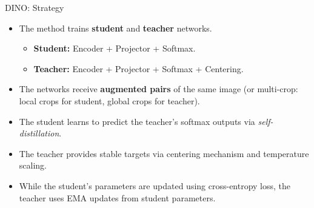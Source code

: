 \documentclass{beamer}
\begin{document}
\begin{frame}{DINO: Strategy}
  \begin{itemize}
  \item The method trains \textbf{student} and \textbf{teacher} networks.
    \begin{itemize}
    \item \textbf{Student:} Encoder + Projector + \alert{Softmax}.
    \item \textbf{Teacher:} Encoder + Projector + \alert{Softmax} + \alert{Centering}.
    \end{itemize}        
    \vspace{0.3cm}
  \item The networks receive \textbf{augmented pairs} of the same image
    (or multi-crop: local crops for student, global crops for teacher).
    \vspace{0.3cm}
  \item The student learns to predict the teacher's \alert{softmax outputs} via \textit{self-distillation}.
    \vspace{0.3cm}
  \item The teacher provides \alert{stable targets} via centering mechanism
    and temperature scaling.
    \vspace{0.3cm}
  \item While the student's parameters are updated using \alert{cross-entropy
    loss}, the teacher uses \alert{EMA updates} from student parameters.
  \end{itemize}
\end{frame}
\end{document}
